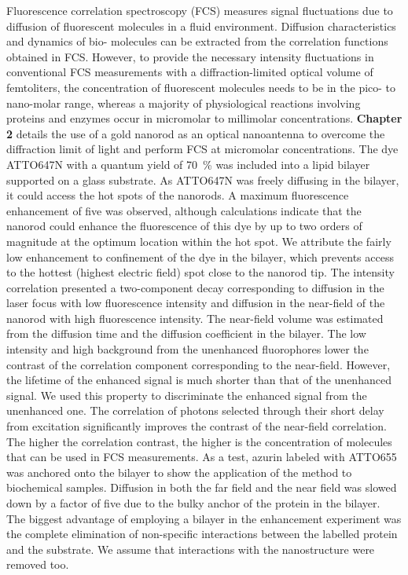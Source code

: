 Fluorescence correlation spectroscopy (FCS) measures signal fluctuations due to diffusion of fluorescent molecules in a fluid environment.
Diffusion characteristics and dynamics of bio- molecules can be extracted from the correlation functions obtained in FCS.
However, to provide the necessary intensity fluctuations in conventional FCS measurements with a diffraction-limited optical volume of femtoliters, the concentration of fluorescent molecules needs to be in the pico- to nano-molar range, whereas a majority of physiological reactions involving proteins and enzymes occur in micromolar to millimolar concentrations. 
\textbf{Chapter 2} details the use of a gold nanorod as an optical nanoantenna to overcome the diffraction limit of light and perform FCS at micromolar concentrations.
The dye ATTO647N with a quantum yield of \SI{70}{\percent} was included into a lipid bilayer supported on a glass substrate.
As ATTO647N was freely diffusing in the bilayer, it could access the hot spots of the nanorods.
A maximum fluorescence enhancement of five was observed, although calculations indicate that the nanorod could enhance the fluorescence of this dye by up to two orders of magnitude at the optimum location within the hot spot.
We attribute the fairly low enhancement to confinement of the dye in the bilayer, which prevents access to the hottest (highest electric field) spot close to the nanorod tip.
The intensity correlation presented a two-component decay corresponding to diffusion in the laser focus with low fluorescence intensity and diffusion in the near-field of the nanorod with high fluorescence intensity.
The near-field volume was estimated from the diffusion time and the diffusion coefficient in the bilayer.
The low intensity and high background from the unenhanced fluorophores lower the contrast of the correlation component corresponding to the near-field.
However, the lifetime of the enhanced signal is much shorter than that of the unenhanced signal. We used this property to discriminate the enhanced signal from the unenhanced one.
The correlation of photons selected through their short delay from excitation significantly improves the contrast of the near-field correlation.
The higher the correlation contrast, the higher is the concentration of molecules that can be used in FCS measurements.
As a test, azurin labeled with ATTO655 was anchored onto the bilayer to show the application of the method to biochemical samples.
Diffusion in both the far field and the near field was slowed down by a factor of five due to the bulky anchor of the protein in the bilayer.
The biggest advantage of employing a bilayer in the enhancement experiment was the complete elimination of non-specific interactions between the labelled protein and the substrate.
We assume that interactions with the nanostructure were removed too.


